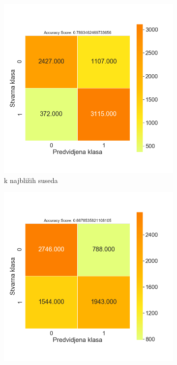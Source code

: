 \documentclass[12pt,oneside]{memoir}
\begin{document}
\begin{figure}[!ht]
    \centering
    \begin{subfigure}[b]{0.45\textwidth}
        \centering
        \includegraphics[width=\textwidth]{KNN_feature_selection_oversampled_confussion_matrix}
        \caption{k najbližih suseda}
        \label{fig:knear4}
    \end{subfigure}
    \begin{subfigure}[b]{0.45\textwidth}
        \centering
        \includegraphics[width=\textwidth]{LR_feature_selection_oversampling_confussion_matrix}

\end{subfigure}
\end{figure}
\end{document}

